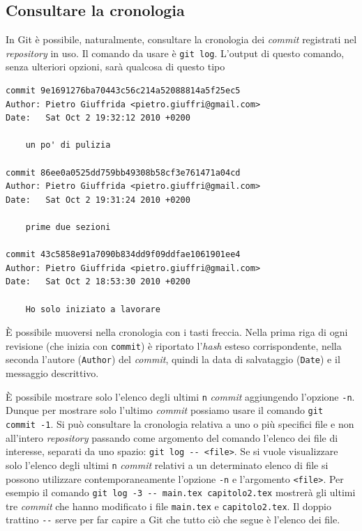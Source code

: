 \documentclass[a4paper,12pt,oneside]{article}
\begin{document}
\subsection{Consultare la cronologia}
\label{sec:consultare-cronologia}

In Git è possibile, naturalmente, consultare la cronologia dei \emph{commit}
registrati nel \emph{repository} in uso. Il comando da usare è
\lstinline|git log|. L'output di questo comando, senza ulteriori opzioni, sarà
qualcosa di questo tipo
\begin{lstlisting}
commit 9e1691276ba70443c56c214a52088814a5f25ec5
Author: Pietro Giuffrida <pietro.giuffri@gmail.com>
Date:   Sat Oct 2 19:32:12 2010 +0200

    un po' di pulizia

commit 86ee0a0525dd759bb49308b58cf3e761471a04cd
Author: Pietro Giuffrida <pietro.giuffri@gmail.com>
Date:   Sat Oct 2 19:31:24 2010 +0200

    prime due sezioni

commit 43c5858e91a7090b834dd9f09ddfae1061901ee4
Author: Pietro Giuffrida <pietro.giuffri@gmail.com>
Date:   Sat Oct 2 18:53:30 2010 +0200

    Ho solo iniziato a lavorare
\end{lstlisting}
È possibile muoversi nella cronologia con i tasti freccia. Nella prima riga di
ogni revisione (che inizia con \lstinline|commit|) è riportato l'\emph{hash}
esteso corrispondente, nella seconda l'autore (\lstinline|Author|) del
\emph{commit}, quindi la data di salvataggio (\lstinline|Date|) e il messaggio
descrittivo.

È possibile mostrare solo l'elenco degli ultimi \lstinline|n| \emph{commit}
aggiungendo l'opzione \lstinline|-n|. Dunque per mostrare solo l'ultimo
\emph{commit} possiamo usare il comando \lstinline|git commit -1|. Si può
consultare la cronologia relativa a uno o più specifici file e non all'intero
\emph{repository} passando come argomento del comando l'elenco dei file di
interesse, separati da uno spazio: \lstinline|git log -- <file>|. Se si vuole
visualizzare solo l'elenco degli ultimi \lstinline|n| \emph{commit} relativi a
un determinato elenco di file si possono utilizzare contemporaneamente l'opzione
\lstinline|-n| e l'argomento \lstinline|<file>|. Per esempio il comando
\lstinline|git log -3 -- main.tex capitolo2.tex| mostrerà gli ultimi tre
\emph{commit} che hanno modificato i file \lstinline|main.tex| e
\lstinline|capitolo2.tex|. Il doppio trattino \lstinline|--| serve per far
capire a Git che tutto ciò che segue è l'elenco dei file.
\end{document}
